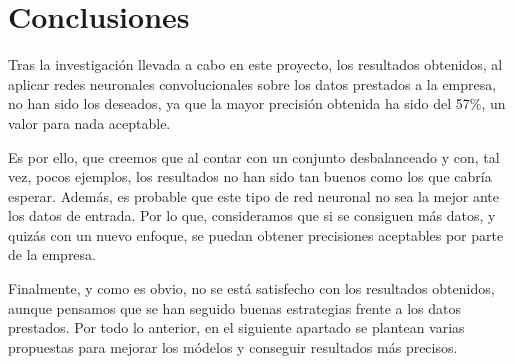 
\section{Conclusiones}
Tras la investigación llevada a cabo en este proyecto, los resultados obtenidos, al aplicar redes neuronales convolucionales sobre los datos prestados a la empresa, no han sido los deseados, ya que la mayor precisión obtenida ha sido del 57\%, un valor para nada aceptable.

Es por ello, que creemos que al contar con un conjunto desbalanceado y con, tal vez, pocos ejemplos, los resultados no han sido tan buenos como los que cabría esperar. Además, es probable que este tipo de red neuronal no sea la mejor ante los datos de entrada. Por lo que, consideramos que si se consiguen más datos, y quizás con un nuevo enfoque, se puedan obtener precisiones aceptables por parte de la empresa.

Finalmente, y como es obvio, no se está satisfecho con los resultados obtenidos, aunque pensamos que se han seguido buenas estrategias frente a los datos prestados. Por todo lo anterior, en el siguiente apartado se plantean varias propuestas para mejorar los módelos y conseguir resultados más precisos. 

